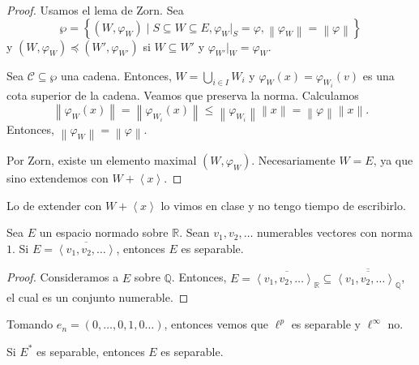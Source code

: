 \begin{proof}
	Usamos el lema de Zorn. Sea
	$$\wp = \left\{ (W, \varphi_W)  \mid S \subseteq W \subseteq E, \varphi_W|_S = \varphi, \left\lVert \varphi_W \right\rVert = \left\lVert \varphi \right\rVert \right\}$$
	y $(W, \varphi_W) \preceq (W', \varphi_{W'})$ si $W \subseteq W'$ y $\varphi_{W'}|_{W} = \varphi_{W}$.

	Sea $\mathcal{C} \subseteq \wp$ una cadena. Entonces, $W = \bigcup_{i \in I} W_i$ y $\varphi_W (x) = \varphi_{W_i}(v)$ es una cota superior de la cadena. Veamos que preserva la norma. Calculamos
	\begin{equation*}
		\left\lVert \varphi_{W}(x) \right\rVert = \left\lVert \varphi_{W_i}(x) \right\rVert \leq \left\lVert \varphi_{W_i} \right\rVert \left\lVert x \right\rVert = \left\lVert \varphi \right\rVert \left\lVert x \right\rVert.
	\end{equation*}
	Entonces, $\left\lVert \varphi_{W} \right\rVert = \left\lVert \varphi \right\rVert$.

	Por Zorn, existe un elemento maximal $(W, \varphi_{W})$. Necesariamente $W = E$, ya que sino extendemos con $W + \left\langle x \right\rangle$.
\end{proof}

Lo de extender con $W + \left\langle x \right\rangle$ lo vimos en clase y no tengo tiempo de escribirlo.

\begin{proposition}
	Sea $E$ un espacio normado sobre $\mathbb{R}$. Sean $v_1, v_2, \ldots $ numerables vectores con norma $1$. Si $E = \overline{\left\langle v_1, v_2, \ldots \right\rangle}$, entonces $E$ es separable.
\end{proposition}

\begin{proof}
	Consideramos a $E$ sobre $\mathbb{Q}$. Entonces, $E = \overline{\left\langle v_1, v_2, \ldots \right\rangle_{\mathbb{R}}} \subseteq \overline{\overline{\left\langle v_1, v_2, \ldots \right\rangle_{\mathbb{Q}}}}$, el cual es un conjunto numerable.
\end{proof}

\begin{remark}
	Tomando $e_n = (0, \ldots, 0, 1, 0 \ldots)$, entonces vemos que $\ell^p$ es separable y $\ell^{\infty}$ no.
\end{remark}

\begin{theorem}
	Si $E^*$ es separable, entonces $E$ es separable.
\end{theorem}

